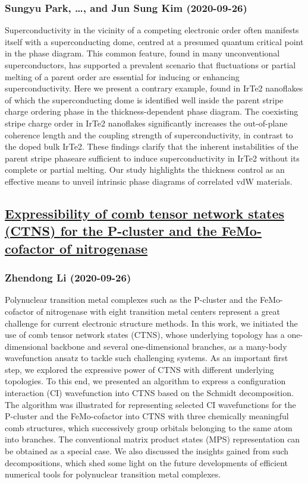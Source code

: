 \subsubsection*{Sungyu Park, \dots, and Jun Sung Kim (2020-09-26)}
Superconductivity in the vicinity of a competing electronic order often
manifests itself with a superconducting dome, centred at a presumed quantum
critical point in the phase diagram. This common feature, found in many
unconventional superconductors, has supported a prevalent scenario that
fluctuations or partial melting of a parent order are essential for inducing or
enhancing superconductivity. Here we present a contrary example, found in IrTe2
nanoflakes of which the superconducting dome is identified well inside the
parent stripe charge ordering phase in the thickness-dependent phase diagram.
The coexisting stripe charge order in IrTe2 nanoflakes significantly increases
the out-of-plane coherence length and the coupling strength of
superconductivity, in contrast to the doped bulk IrTe2. These findings clarify
that the inherent instabilities of the parent stripe phaseare sufficient to
induce superconductivity in IrTe2 without its complete or partial melting. Our
study highlights the thickness control as an effective means to unveil
intrinsic phase diagrams of correlated vdW materials.

\subsection*{\href{http://arxiv.org/abs/2009.12573v1}{Expressibility of comb tensor network states (CTNS) for the P-cluster  and the FeMo-cofactor of nitrogenase}}
\subsubsection*{Zhendong Li (2020-09-26)}
Polynuclear transition metal complexes such as the P-cluster and the
FeMo-cofactor of nitrogenase with eight transition metal centers represent a
great challenge for current electronic structure methods. In this work, we
initiated the use of comb tensor network states (CTNS), whose underlying
topology has a one-dimensional backbone and several one-dimensional branches,
as a many-body wavefunction ansatz to tackle such challenging systems. As an
important first step, we explored the expressive power of CTNS with different
underlying topologies. To this end, we presented an algorithm to express a
configuration interaction (CI) wavefunction into CTNS based on the Schmidt
decomposition. The algorithm was illustrated for representing selected CI
wavefunctions for the P-cluster and the FeMo-cofactor into CTNS with three
chemically meaningful comb structures, which successively group orbitals
belonging to the same atom into branches. The conventional matrix product
states (MPS) representation can be obtained as a special case. We also
discussed the insights gained from such decompositions, which shed some light
on the future developments of efficient numerical tools for polynuclear
transition metal complexes.

